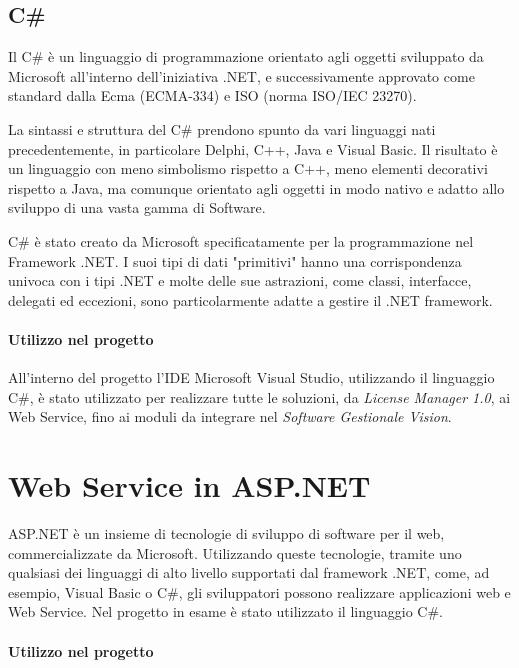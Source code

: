 \subsection{C\#}
Il C\# è un linguaggio di programmazione orientato agli oggetti sviluppato da Microsoft all'interno dell'iniziativa .NET, e successivamente approvato come standard dalla Ecma (ECMA-334) e ISO (norma ISO/IEC 23270).

La sintassi e struttura del C\# prendono spunto da vari linguaggi nati precedentemente, in particolare Delphi, C++, Java e Visual Basic. Il risultato è un linguaggio con meno simbolismo rispetto a C++, meno elementi decorativi rispetto a Java, ma comunque orientato agli oggetti in modo nativo e adatto allo sviluppo di una vasta gamma di Software.

C\# è stato creato da Microsoft specificatamente per la programmazione nel Framework .NET. I suoi tipi di dati "primitivi" hanno una corrispondenza univoca con i tipi .NET e molte delle sue astrazioni, come classi, interfacce, delegati ed eccezioni, sono particolarmente adatte a gestire il .NET framework.


\paragraph{Utilizzo nel progetto}

All'interno del progetto l'IDE Microsoft Visual Studio, utilizzando il linguaggio C\#, è stato utilizzato per realizzare tutte le soluzioni, da \textit{License Manager 1.0}, ai Web Service, fino ai moduli da integrare nel \textit{Software Gestionale Vision}. 

\section{Web Service in ASP.NET}

ASP.NET è un insieme di tecnologie di sviluppo di software per il web, commercializzate da Microsoft. Utilizzando queste tecnologie, tramite uno qualsiasi dei linguaggi di alto livello supportati dal framework .NET, come, ad esempio, Visual Basic o C\#, gli sviluppatori possono realizzare applicazioni web e Web Service.
Nel progetto in esame è stato utilizzato il linguaggio C\#{}.

\paragraph{Utilizzo nel progetto}


